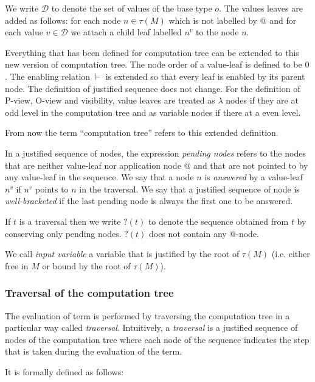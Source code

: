 We write $\mathcal{D}$ to denote the set of values of the base type $o$.
The values leaves are added as follows: for each node $n \in \tau(M)$ which is not labelled by $@$
and for each value $v \in \mathcal{D}$ we attach a child leaf labelled $n^v$ to the node $n$.

Everything that has been defined for computation tree can be extended to this new version of computation tree.
The node order of a value-leaf is defined to be $0$. The enabling relation $\vdash$ is extended so that every leaf is enabled
by its parent node. The definition of justified sequence does not change.
For the definition of P-view, O-view and visibility, value leaves are treated as $\lambda$ nodes if they are at odd level in the computation tree and
as variable nodes if there at a even level.

From now the term ``computation tree'' refers to this extended definition.

In a justified sequence of nodes, the expression \emph{pending nodes} refers to
the nodes that are neither value-leaf nor application node $@$ and
that are not pointed to by any value-leaf in the sequence. We say
that a node $n$ is \emph{answered} by a value-leaf
$n^v$ if $n^v$ points to $n$ in the traversal. We say that a
justified sequence of node is \emph{well-bracketed} if the last
pending node is always the first one to be answered.

If $t$ is a traversal then we write $?(t)$ to denote the sequence
obtained from $t$ by conserving only pending nodes. $?(t)$ does not contain any $@$-node.

We call \emph{input variable} a variable that is justified by the root of $\tau(M)$ (i.e. either free in $M$ or bound by the root of $\tau(M)$).

\subsubsection{Traversal of the computation tree}
The evaluation of term is performed by traversing the computation tree in a particular way called
\emph{traversal}. Intuitively, a \emph{traversal} is a justified sequence of nodes of the computation tree where each node
of the sequence indicates the step that is taken during the evaluation of the term.

It is formally defined as follows:

